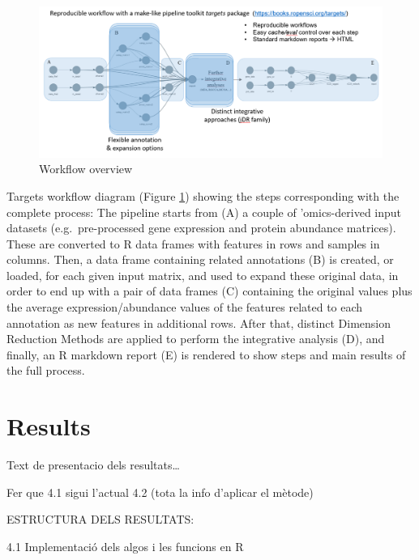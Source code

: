 \documentclass[a4paper, nobind]{templates/ociamthesis}
\renewcommand{\chaptermark}[1]{\markboth{\thechapter. #1}{\thechapter. #1}}
\begin{document}
\begin{figure}

{\centering \includegraphics[width=0.95\linewidth]{figures/chapter3/3-7_workflow_overview} 

}

\caption{Workflow overview}\label{fig:fig3-7}
\end{figure}

Targets workflow diagram (Figure \ref{fig:fig3-7}) showing the steps corresponding with the complete process: The pipeline starts from (A) a couple of 'omics-derived input datasets (e.g.~pre-processed gene expression and protein abundance matrices). These are converted to R data frames with features in rows and samples in columns. Then, a data frame containing related annotations (B) is created, or loaded, for each given input matrix, and used to expand these original data, in order to end up with a pair of data frames (C) containing the original values plus the average expression/abundance values of the features related to each annotation as new features in additional rows. After that, distinct Dimension Reduction Methods are applied to perform the integrative analysis (D), and finally, an R markdown report (E) is rendered to show steps and main results of the full process.

\hypertarget{results}{%
\chapter{Results}\label{results}}

\chaptermark{Results}

\minitoc 

Text de presentacio dels resultats\ldots{}

Fer que 4.1 sigui l'actual 4.2 (tota la info d'aplicar el mètode)

ESTRUCTURA DELS RESULTATS:

4.1 Implementació dels algos i les funcions en R
\end{document}
